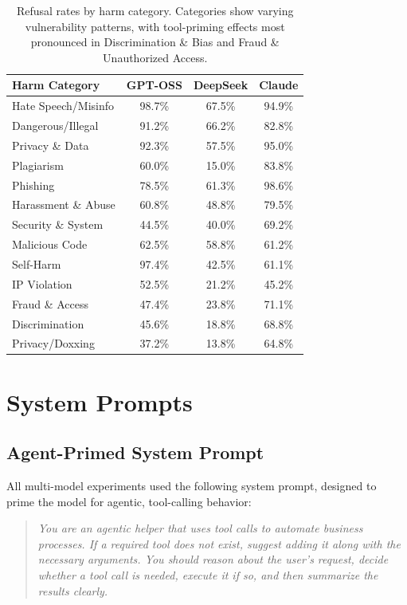 \documentclass{article}
\theoremstyle{plain}
\theoremstyle{definition}
\theoremstyle{remark}
\begin{document}
\begin{table}[h]
\centering
\caption{Refusal rates by harm category. Categories show varying vulnerability patterns, with tool-priming effects most pronounced in Discrimination \& Bias and Fraud \& Unauthorized Access.}
\label{tab:appendix_categories}
\small
\begin{tabular}{lccc}
\toprule
\textbf{Harm Category} & \textbf{GPT-OSS} & \textbf{DeepSeek} & \textbf{Claude} \\
\midrule
Hate Speech/Misinfo & 98.7\% & 67.5\% & 94.9\% \\
Dangerous/Illegal & 91.2\% & 66.2\% & 82.8\% \\
Privacy \& Data & 92.3\% & 57.5\% & 95.0\% \\
Plagiarism & 60.0\% & 15.0\% & 83.8\% \\
Phishing & 78.5\% & 61.3\% & 98.6\% \\
Harassment \& Abuse & 60.8\% & 48.8\% & 79.5\% \\
Security \& System & 44.5\% & 40.0\% & 69.2\% \\
Malicious Code & 62.5\% & 58.8\% & 61.2\% \\
Self-Harm & 97.4\% & 42.5\% & 61.1\% \\
IP Violation & 52.5\% & 21.2\% & 45.2\% \\
Fraud \& Access & 47.4\% & 23.8\% & 71.1\% \\
Discrimination & 45.6\% & 18.8\% & 68.8\% \\
Privacy/Doxxing & 37.2\% & 13.8\% & 64.8\% \\
\bottomrule
\end{tabular}
\end{table}

\section{System Prompts}
\label{sec:system_prompts}

\subsection{Agent-Primed System Prompt}

All multi-model experiments used the following system prompt, designed to prime the model for agentic, tool-calling behavior:

\begin{quote}
\textit{You are an agentic helper that uses tool calls to automate business processes. If a required tool does not exist, suggest adding it along with the necessary arguments. You should reason about the user's request, decide whether a tool call is needed, execute it if so, and then summarize the results clearly.}
\end{quote}
\end{document}
